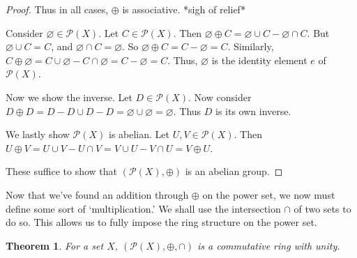 \documentclass[10pt, letterpaper]{article}
\newcommand{\union}{\cup}
\newcommand{\powerset}[1]{\mathcal{P}(#1)}
\newcommand{\intersect}{\cap}
\newtheorem{theorem}{Theorem}
\theoremstyle{definition}
\begin{document}
\begin{proof}
	Thus in all cases, \(\oplus\) is associative. *sigh of relief*

	Consider \(\varnothing\in\powerset{X}\). Let \(C\in\powerset{X}\). Then
	\(\varnothing\oplus C = \varnothing\union C - \varnothing \intersect C\).
	But \(\varnothing\union C=C\), and \(\varnothing\intersect C=\varnothing\). 
	So \(\varnothing\oplus C = C - \varnothing = C\). 
	Similarly, \(C\oplus\varnothing=C\union\varnothing - C\intersect\varnothing=C-\varnothing=C\).
	Thus, \(\varnothing\) is the identity element \(e\) of \(\powerset{X}\).

	Now we show the inverse. Let \(D\in\powerset{X}\). 
	Now consider \(D\oplus D=D-D\cup D-D = \varnothing\cup\varnothing=\varnothing\).
	Thus \(D\) is its own inverse.

	We lastly show \(\powerset{X}\) is abelian. Let \(U,V\in\powerset{X}\).
	Then \(U\oplus V = U\cup V - U\cap V = V\cup U - V\cap U = V\oplus U\).

	These suffice to show that \((\powerset{X}, \oplus)\) is an abelian group.

\end{proof}
\fi
Now that we've found an addition through $\oplus$ on the power set,
we now must define some sort of `multiplication.' 
We shall use the intersection $\cap$ of two sets to do so. 
This allows us to fully impose the ring structure on the power set.

\begin{theorem}\label{thm_powerset_ba}
	For a set \(X\), \((\powerset{X}, \oplus, \cap)\) is a commutative ring with unity.
\end{theorem}
\end{document}
